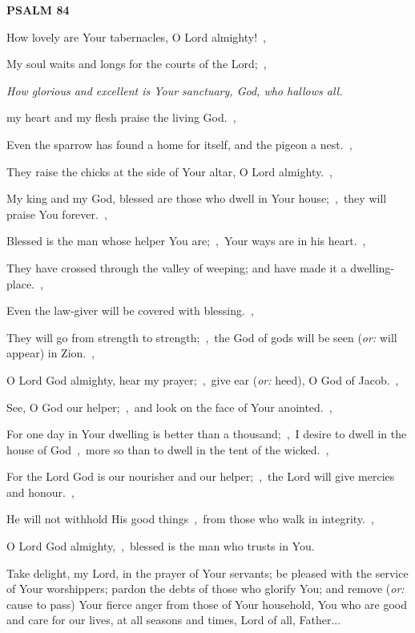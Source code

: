 \documentclass[12pt,twoside,a5paper]{article}
\newcommand{\psalm}[1]{\textbf{PSALM {#1}}\nopagebreak}
\newcommand{\qanona}[1]{{\liturgicalhint{Qanona.} \emph{#1}}}
\newcommand{\slota}[1]{\liturgicalhint{Slota.} #1}
\newcommand{\translationoption}[1]{\emph{or:} #1}
\begin{document}
\psalm{84}

\begin{normalparskip}
  How lovely are Your tabernacles, O Lord almighty!~\sep

  My soul waits and longs for the courts of the Lord;~\sep

  \qanona{How glorious and excellent is Your sanctuary, God, who hallows all.}

  my heart and my flesh praise the living God.~\sep

  Even the sparrow has found a home for itself, and the pigeon a nest.~\sep

  They raise the chicks at the side of Your altar, O Lord almighty.~\sep

  My king and my God, blessed are those who dwell in Your house;~\sep\ they will praise You forever.~\sep

  Blessed is the man whose helper You are;~\sep\ Your ways are in his heart.~\sep

  They have crossed through the valley of weeping; and have made it a dwelling-place.~\sep

  Even the law-giver will be covered with blessing.~\sep

  They will go from strength to strength;~\sep\ the God of gods will be seen (\translationoption{will appear}) in Zion.~\sep

  O Lord God almighty, hear my prayer;~\sep\ give ear (\translationoption{heed}), O God of Jacob.~\sep

  See, O God our helper;~\sep\ and look on the face of Your anointed.~\sep

  For one day in Your dwelling is better than a thousand;~\sep\ I desire to dwell in the house of God~\sep\ more so than to dwell in the tent of the wicked.~\sep

  For the Lord God is our nourisher and our helper;~\sep\ the Lord will give mercies and honour.~\sep

  He will not withhold His good things~\sep\ from those who walk in integrity.~\sep

  O Lord God almighty,~\sep\ blessed is the man who trusts in You.
\end{normalparskip}

\slota{Take delight, my Lord, in the prayer of Your servants; be pleased with the service of Your worshippers; pardon the debts of those who glorify You; and remove (\translationoption{cause to pass}) Your fierce anger from those of Your household, You who are good and care for our lives, at all seasons and times, Lord of all, Father...}
\end{document}

